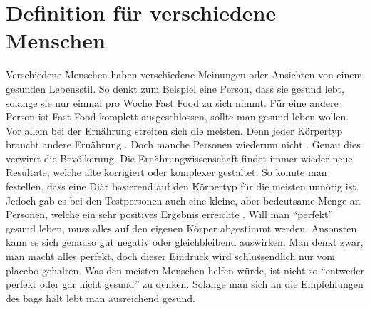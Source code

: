 \section{Definition für verschiedene Menschen}
\authortoc{\jonas}{\sectionident}
Verschiedene Menschen haben verschiedene Meinungen oder Ansichten von einem gesunden Lebensstil. So denkt zum Beispiel eine Person, dass sie gesund lebt, solange sie nur einmal pro Woche Fast Food zu sich nimmt. Für eine andere Person ist Fast Food komplett ausgeschlossen, sollte man gesund leben wollen. Vor allem bei der Ernährung streiten sich die meisten. Denn jeder Körpertyp braucht andere Ernährung \cite{all-about-body-type-eating}. Doch manche Personen wiederum nicht \cite{all-about-body-type-eating}. Genau dies verwirrt die Bevölkerung.
\newline
Die Ernährungwissenschaft findet immer wieder neue Resultate, welche alte korrigiert oder komplexer gestaltet. So konnte man festellen, dass eine Diät basierend auf den Körpertyp für die meisten unnötig ist. Jedoch gab es bei den Testpersonen auch eine kleine, aber bedeutsame Menge an Personen, welche ein sehr positives Ergebnis erreichte \cite{all-about-body-type-eating}.
\newline
\newline
Will man “perfekt” gesund leben, muss alles auf den eigenen Körper abgestimmt werden. Ansonsten kann es sich genauso gut negativ oder gleichbleibend auswirken. Man denkt zwar, man macht alles perfekt, doch dieser Eindruck wird schlussendlich nur vom \acs{placebo} gehalten.
\newline
\newline
Was den meisten Menschen helfen würde, ist nicht so “entweder perfekt oder gar nicht gesund” zu denken. Solange man sich an die Empfehlungen des \acsp{bag} hält lebt man ausreichend gesund.
